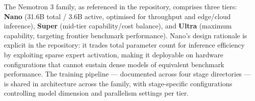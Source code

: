 The Nemotron 3 family, as referenced in the repository, comprises three
tiers: \textbf{Nano} (31.6B total / 3.6B active, optimised for throughput
and edge/cloud inference), \textbf{Super} (mid-tier capability/cost
balance), and \textbf{Ultra} (maximum capability, targeting frontier
benchmark performance). Nano's design rationale is explicit in the
repository: it trades total parameter count for inference efficiency by
exploiting sparse expert activation, making it deployable on hardware
configurations that cannot sustain dense models of equivalent benchmark
performance. The training pipeline — documented across four stage
directories — is shared in architecture across the family, with
stage-specific configurations controlling model dimension and parallelism
settings per tier.
